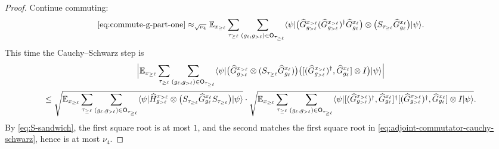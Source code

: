 \begin{proof}
	Continue commuting:
	\begin{align}
		\eqref{eq:commute-g-part-one}
		\approx_{\sqrt{\nu_4}}
		\mathbb{E}_{x_{\ge \ell}} \sum_{\tau_{\ge \ell}} \sum_{(g_\ell,g_{>\ell})\in \mathsf O_{\tau_{\ge \ell}}}
		\langle \psi \rvert
		\bigl(\widehat G_{g_{>\ell}}^{x_{>\ell}}(\widehat G_{g_{>\ell}}^{x_{>\ell}})^\dagger \widehat G_{g_\ell}^{x_\ell}\bigr)
		\otimes \bigl(S_{\tau_{\ge \ell}}\widehat G_{g_\ell}^{x_\ell}\bigr)\lvert \psi \rangle.
		\label{eq:commute-g-part-two}
	\end{align}
	This time the Cauchy--Schwarz step is
	\begin{multline}\label{eq:second-cauchy-schwarz-bound}
		\Bigl|
		\mathbb{E}_{x_{\ge \ell}} \sum_{\tau_{\ge \ell}} \sum_{(g_\ell,g_{>\ell})\in \mathsf O_{\tau_{\ge \ell}}}
		\langle \psi \rvert
		\bigl(\widehat G_{g_{>\ell}}^{x_{>\ell}} \otimes (S_{\tau_{\ge \ell}}\widehat G_{g_\ell}^{x_\ell})\bigr)
		\bigl([(\widehat G_{g_{>\ell}}^{x_{>\ell}})^\dagger,\widehat G_{g_\ell}^{x_\ell}] \otimes I\bigr)
		\lvert \psi \rangle
		\Bigr|\\
		\le
		\sqrt{
		\mathbb{E}_{x_{\ge \ell}} \sum_{\tau_{\ge \ell}} \sum_{(g_\ell,g_{>\ell})\in \mathsf O_{\tau_{\ge \ell}}}
		\langle \psi \rvert
		\widehat H_{g_{>\ell}}^{x_{>\ell}}
		\otimes \bigl(S_{\tau_{\ge \ell}}\widehat G_{g_\ell}^{x_\ell}S_{\tau_{\ge \ell}}\bigr)
		\lvert \psi \rangle
		}
		\cdot
		\sqrt{
		\mathbb{E}_{x_{\ge \ell}} \sum_{\tau_{\ge \ell}} \sum_{(g_\ell,g_{>\ell})\in \mathsf O_{\tau_{\ge \ell}}}
		\langle \psi \rvert
		[(\widehat G_{g_{>\ell}}^{x_{>\ell}})^\dagger,\widehat G_{g_\ell}^{x_\ell}]^\dagger
		[(\widehat G_{g_{>\ell}}^{x_{>\ell}})^\dagger,\widehat G_{g_\ell}^{x_\ell}]
		\otimes I
		\lvert \psi \rangle
		}.
	\end{multline}
	By \ref{eq:S-sandwich}, the first square root is at most $1$, and the second matches the first square root in \ref{eq:adjoint-commutator-cauchy-schwarz}, hence is at most $\nu_4$.


\end{proof}
